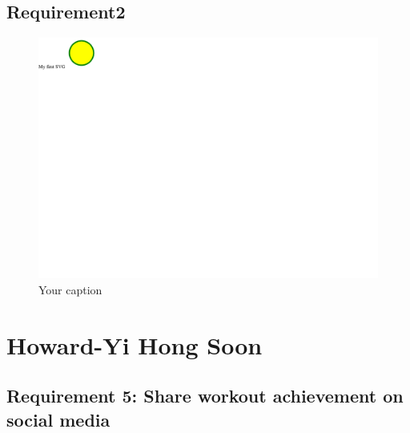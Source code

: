 \documentclass{article}
\begin{document}
	\subsection{Requirement2}
		\begin{figure}[h!]
		    \centering
		    \captionsetup{labelformat=empty}
		    \caption{Your caption}
		    \includegraphics[width=\textwidth, angle=0]{Kreis2.pdf}
		\end{figure}
		\newpage

\section{Howard-Yi Hong Soon}
		\subsection{Requirement 5: Share workout achievement on social media}
		
\end{document}

